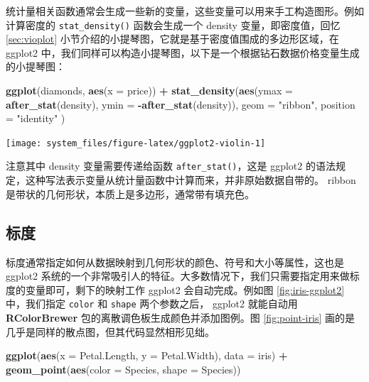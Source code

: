 \documentclass[
  b5paper,
  UTF8,twoside]{book}
\newenvironment{Shaded}{\begin{snugshade}}{\end{snugshade}}
\newcommand{\AttributeTok}[1]{\textcolor[rgb]{0.13,0.29,0.53}{#1}}
\newcommand{\FunctionTok}[1]{\textcolor[rgb]{0.13,0.29,0.53}{\textbf{#1}}}
\newcommand{\NormalTok}[1]{#1}
\newcommand{\SpecialCharTok}[1]{\textcolor[rgb]{0.81,0.36,0.00}{\textbf{#1}}}
\newcommand{\StringTok}[1]{\textcolor[rgb]{0.31,0.60,0.02}{#1}}
\begin{document}
统计量相关函数通常会生成一些新的变量，这些变量可以用来手工构造图形。例如计算密度的 \texttt{stat\_density()} 函数会生成一个 density 变量，即密度值，回忆 \ref{sec:vioplot} 小节介绍的小提琴图，它就是基于密度值围成的多边形区域，在 ggplot2 中，我们同样可以构造小提琴图，以下是一个根据钻石数据价格变量生成的小提琴图：

\begin{Shaded}
\begin{Highlighting}[]
\FunctionTok{ggplot}\NormalTok{(diamonds, }\FunctionTok{aes}\NormalTok{(}\AttributeTok{x =}\NormalTok{ price)) }\SpecialCharTok{+}
  \FunctionTok{stat\_density}\NormalTok{(}\FunctionTok{aes}\NormalTok{(}\AttributeTok{ymax =} \FunctionTok{after\_stat}\NormalTok{(density), }\AttributeTok{ymin =} \SpecialCharTok{{-}}\FunctionTok{after\_stat}\NormalTok{(density)),}
    \AttributeTok{geom =} \StringTok{"ribbon"}\NormalTok{, }\AttributeTok{position =} \StringTok{"identity"}
\NormalTok{  )}
\end{Highlighting}
\end{Shaded}

\begin{center}\texttt{[image: system\_files/figure-latex/ggplot2-violin-1]} \end{center}

注意其中 density 变量需要传递给函数 \texttt{after\_stat()}，这是 ggplot2 的语法规定，这种写法表示变量从统计量函数中计算而来，并非原始数据自带的。 ribbon 是带状的几何形状，本质上是多边形，通常带有填充色。

\subsection{标度}\label{ux6807ux5ea6}

标度通常指定如何从数据映射到几何形状的颜色、符号和大小等属性，这也是 ggplot2 系统的一个非常吸引人的特征。大多数情况下，我们只需要指定用来做标度的变量即可，剩下的映射工作 ggplot2 会自动完成。例如图 \ref{fig:iris-ggplot2} 中，我们指定 \texttt{color} 和 \texttt{shape} 两个参数之后， ggplot2 就能自动用 \textbf{RColorBrewer} 包的离散调色板生成颜色并添加图例。图 \ref{fig:point-iris} 画的是几乎是同样的散点图，但其代码显然相形见绌。

\begin{Shaded}
\begin{Highlighting}[]
\FunctionTok{ggplot}\NormalTok{(}\FunctionTok{aes}\NormalTok{(}\AttributeTok{x =}\NormalTok{ Petal.Length, }\AttributeTok{y =}\NormalTok{ Petal.Width), }\AttributeTok{data =}\NormalTok{ iris) }\SpecialCharTok{+}
  \FunctionTok{geom\_point}\NormalTok{(}\FunctionTok{aes}\NormalTok{(}\AttributeTok{color =}\NormalTok{ Species, }\AttributeTok{shape =}\NormalTok{ Species))}
\end{Highlighting}
\end{Shaded}
\end{document}
